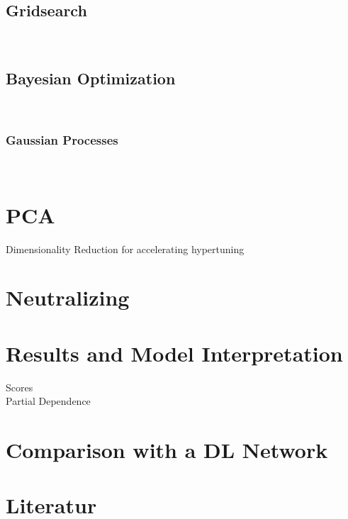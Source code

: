 \documentclass[12pt, a4paper]{article}
\begin{document}
\subsection{Gridsearch}\\

\subsection{Bayesian Optimization}\\
\subsubsection{Gaussian Processes} \\

\section{PCA}
Dimensionality Reduction for accelerating hypertuning \\
\section{Neutralizing}

\section{Results and Model Interpretation}
Scores \\
Partial Dependence \\
\section{Comparison with a DL Network}
\newpage
\section{Literatur}
\printbibliography
\newpage
\listoffigures
\end{document}
